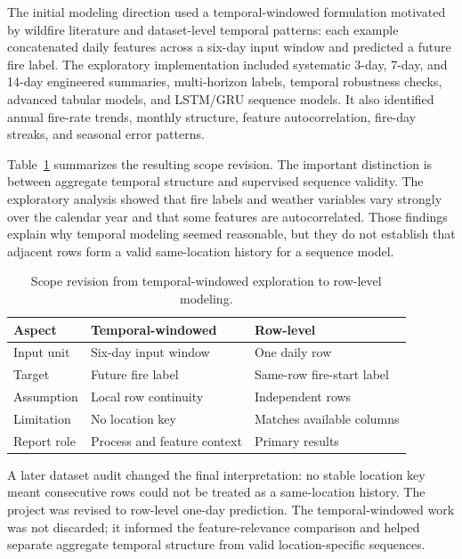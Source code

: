 \documentclass{article}
\begin{document}
The initial modeling direction used a temporal-windowed formulation motivated by wildfire literature and dataset-level temporal patterns: each example concatenated daily features across a six-day input window and predicted a future fire label. The exploratory implementation included systematic 3\mbox{-}day, 7\mbox{-}day, and 14\mbox{-}day engineered summaries, multi-horizon labels, temporal robustness checks, advanced tabular models, and LSTM/GRU sequence models. It also identified annual fire-rate trends, monthly structure, feature autocorrelation, fire-day streaks, and seasonal error patterns.

Table~\ref{tab:scope_revision} summarizes the resulting scope revision. The important distinction is between aggregate temporal structure and supervised sequence validity. The exploratory analysis showed that fire labels and weather variables vary strongly over the calendar year and that some features are autocorrelated. Those findings explain why temporal modeling seemed reasonable, but they do not establish that adjacent rows form a valid same-location history for a sequence model.

\begin{table}[t]
\caption{Scope revision from temporal-windowed exploration to row-level modeling.}
\label{tab:scope_revision}
\vskip 0.03in
\begin{center}
\begin{scriptsize}
\setlength{\tabcolsep}{2pt}
\begin{tabular}{@{}p{}p{}p{}@{}}
\toprule
Aspect & Temporal-windowed & Row-level \\
\midrule
Input unit & Six-day input window & One daily row \\
Target & Future fire label & Same-row fire-start label \\
Assumption & Local row continuity & Independent rows \\
Limitation & No location key & Matches available columns \\
Report role & Process and feature context & Primary results \\
\bottomrule
\end{tabular}
\end{scriptsize}
\end{center}
\vskip -0.14in
\end{table}

A later dataset audit changed the final interpretation: no stable location key meant consecutive rows could not be treated as a same-location history. The project was revised to row-level one-day prediction. The temporal-windowed work was not discarded; it informed the feature-relevance comparison and helped separate aggregate temporal structure from valid location-specific sequences.
\end{document}
